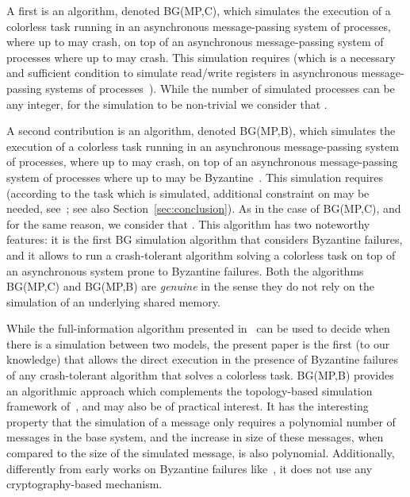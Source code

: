 \documentclass[11pt,letterpaper]{article}
\begin{document}
A first is an algorithm,  denoted BG(MP,C), which simulates the execution 
of a colorless task running in an asynchronous message-passing system of 
processes, where up to  may crash, on top of an  asynchronous
message-passing system of   processes where up to  may crash.
This simulation  requires  (which is a necessary and sufficient
condition to  simulate read/write registers in asynchronous message-passing
systems of  processes~\cite{ABD95}). While the number of simulated
processes  can be any integer, for the simulation to be non-trivial
we consider that .

A second contribution is an
algorithm, denoted BG(MP,B), which simulates the execution of a
colorless task running in an asynchronous message-passing system of 
processes, where up to  may crash, on top of an asynchronous message-passing 
system of  processes where up to  may be Byzantine~\cite{LSP82}.
This simulation requires  (according to the task 
which is simulated, additional constraint on  may be needed, 
see~\cite{HKR14}; see also Section~\ref{sec:conclusion}). 
As in the case of  BG(MP,C), and for the same reason, we consider that .
This algorithm has two noteworthy features: it is the first BG simulation
algorithm that considers Byzantine failures, and it allows to run a
crash-tolerant algorithm solving a colorless task on top of an asynchronous
system prone to Byzantine failures.
Both the algorithms BG(MP,C) and  BG(MP,B) are {\it genuine} in the 
sense they do not rely on the simulation of an underlying shared memory. 


While the  full-information algorithm presented
in~\cite{MTH14} can be used to decide when there is a simulation
between two models, the present paper is the first (to our knowledge)
that allows the direct execution in the presence of Byzantine failures
of any crash-tolerant algorithm that solves a colorless task.
BG(MP,B) provides an algorithmic approach which complements the
topology-based simulation framework of~\cite{MTH14}, and may also be
of practical interest.  It has the interesting property that the
simulation of a message only requires a polynomial number of messages
in the base system, and the increase in size of these messages, when
compared to the size of the simulated message, is also polynomial.
Additionally, differently from early works on Byzantine failures
like~\cite{GMW87}, it does not use any cryptography-based mechanism. 
\end{document}
